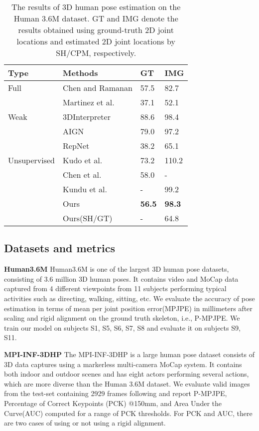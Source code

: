 \documentclass[10pt,twocolumn,letterpaper]{article}
\begin{document}
\begin{table}[t]\small
\setlength\tabcolsep{8pt}
  \centering
  \caption{The results of 3D human pose estimation on the Human 3.6M dataset. GT and IMG denote the results obtained using ground-truth 2D joint locations and estimated 2D joint locations by SH/CPM\cite{2016Stacked, 2016CPM}, respectively.}
    \begin{tabular}{llll}
    \hline
    Type & Methods & GT & IMG \\
    \hline
    Full&Chen and Ramanan\cite{2016match} &57.5&82.7\\
    &Martinez et al.\cite{2017A}&37.1&52.1\\
    \hline
    Weak&3DInterpreter\cite{2016Single}&88.6&98.4\\
    &AIGN\cite{Tung_2017_ICCV}&79.0&97.2\\
    &RepNet\cite{2019RepNet}&38.2&65.1\\
\hline
    Unsupervised&Kudo et al.\cite{2018Unsupervised}&73.2&110.2\\
    &Chen et al.\cite{2020Unsupervised}&58.0&-\\
    &Kundu et al.\cite{2020Kundu}&-&99.2\\
    \hline
    &Ours&\textbf{56.5}&\textbf{98.3}\\
    &Ours(SH/GT)&-&64.8\\
    \hline
    \end{tabular}\label{h36m}\end{table}

\subsection{Datasets and metrics}
\textbf{Human3.6M} Human3.6M is one of the largest 3D human pose datasets, consisting of 3.6 million 3D human poses. It contains video and MoCap data captured from 4 different viewpoints from 11 subjects performing typical activities such as directing, walking, sitting, etc. We evaluate the accuracy of pose estimation in terms of mean per joint position error(MPJPE) in millimeters after scaling and rigid alignment on the ground truth skeleton, i.e., P-MPJPE. We train our model on subjects S1, S5, S6, S7, S8 and evaluate it on subjects S9, S11.

\textbf{MPI-INF-3DHP} The MPI-INF-3DHP is a large human pose dataset consists of 3D data captures using a markerless multi-camera MoCap system. It contains both indoor and outdoor scenes and has eight actors performing several actions, which are more diverse than the Human 3.6M dataset. We evaluate valid images from the test-set containing 2929 frames following \cite{2018End} and report P-MPJPE, Percentage of Correct Keypoints (PCK) @150mm, and Area Under the Curve(AUC) computed for a range of PCK thresholds. For PCK and AUC, there are two cases of using or not using a rigid alignment.
\end{document}
